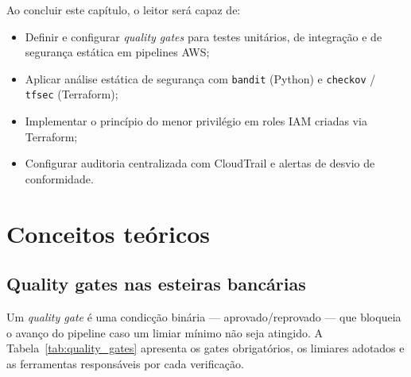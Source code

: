 Ao concluir este cap\'itulo, o leitor ser\'a capaz de:

\begin{itemize}[leftmargin=*]
  \item Definir e configurar \textit{quality gates} para testes unit\'arios,
        de integra\c{c}\~ao e de seguran\c{c}a est\'atica em pipelines AWS;
  \item Aplicar an\'alise est\'atica de seguran\c{c}a com \texttt{bandit}
        (Python) e \texttt{checkov} / \texttt{tfsec} (Terraform);
  \item Implementar o princ\'ipio do menor privil\'egio
        em roles IAM criadas via Terraform;
  \item Configurar auditoria centralizada com CloudTrail
        e alertas de desvio de conformidade.
\end{itemize}

\section{Conceitos te\'oricos}

\subsection{Quality gates nas esteiras banc\'arias}

Um \textit{quality gate} \'e uma condic\c{c}\~ao bin\'aria --- aprovado/reprovado
--- que bloqueia o avan\c{c}o do pipeline caso um limiar m\'inimo n\~ao
seja atingido. A Tabela~\ref{tab:quality_gates} apresenta os gates
obrigat\'orios, os limiares adotados e as ferramentas respons\'aveis
por cada verifica\c{c}\~ao.

